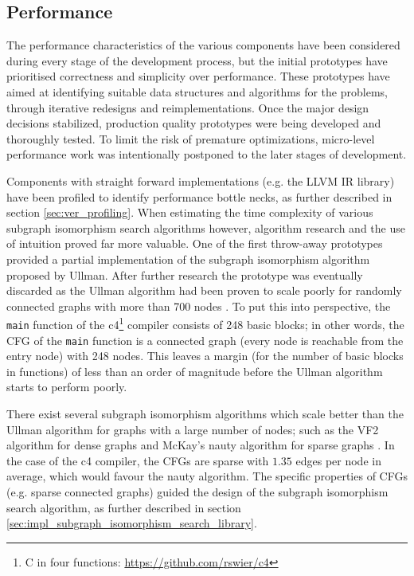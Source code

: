
\subsection{Performance}
\label{sec:ver_performance}

The performance characteristics of the various components have been considered during every stage of the development process, but the initial prototypes have prioritised correctness and simplicity over performance. These prototypes have aimed at identifying suitable data structures and algorithms for the problems, through iterative redesigns and reimplementations. Once the major design decisions stabilized, production quality prototypes were being developed and thoroughly tested. To limit the risk of premature optimizations, micro-level performance work was intentionally postponed to the later stages of development.

Components with straight forward implementations (e.g. the LLVM IR library) have been profiled to identify performance bottle necks, as further described in section \ref{sec:ver_profiling}. When estimating the time complexity of various subgraph isomorphism search algorithms however, algorithm research and the use of intuition proved far more valuable. One of the first throw-away prototypes provided a partial implementation of the subgraph isomorphism algorithm proposed by Ullman. After further research the prototype was eventually discarded as the Ullman algorithm had been proven to scale poorly for randomly connected graphs with more than 700 nodes \cite{iso_performance_comparison}. To put this into perspective, the \texttt{main} function of the c4\footnote{C in four functions: \url{https://github.com/rswier/c4}} compiler consists of 248 basic blocks; in other words, the CFG of the \texttt{main} function is a connected graph (every node is reachable from the entry node) with 248 nodes. This leaves a margin (for the number of basic blocks in functions) of less than an order of magnitude before the Ullman algorithm starts to perform poorly.

There exist several subgraph isomorphism algorithms which scale better than the Ullman algorithm for graphs with a large number of nodes; such as the VF2 algorithm for dense graphs and McKay's nauty algorithm for sparse graphs \cite{iso_performance_comparison,subgraph_isomorphism_algorithms}. In the case of the c4 compiler, the CFGs are sparse with $ 1.35 $ edges per node in average, which would favour the nauty algorithm. The specific properties of CFGs (e.g. sparse connected graphs) guided the design of the subgraph isomorphism search algorithm, as further described in section \ref{sec:impl_subgraph_isomorphism_search_library}.

